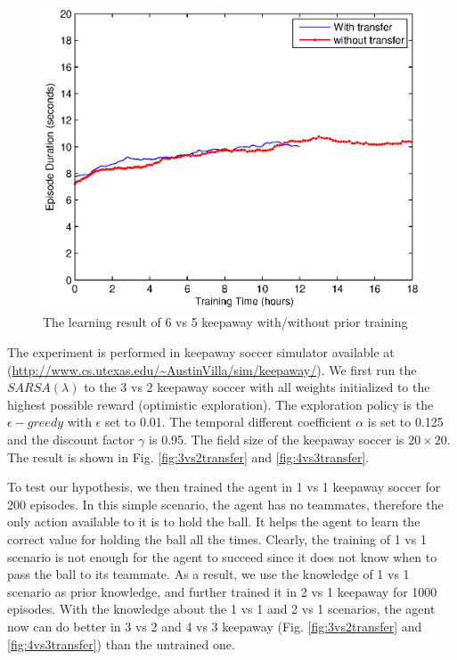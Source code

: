 \begin{figure}[h]
    \centering
    \begin{minipage}[t]{0.6\linewidth}
        \centering
        \includegraphics[width=\textwidth] {./figures/6vs5transfer.eps}
        \caption{The learning result of 6 vs 5 keepaway with/without prior training}
    \label{fig:6vs5transfer}
    \end{minipage}
\end{figure}
The experiment is performed in keepaway soccer simulator available at \\
(\url{http://www.cs.utexas.edu/~AustinVilla/sim/keepaway/}).
We first run the $SARSA(\lambda)$ to the 3 vs 2 keepaway soccer with all weights initialized to the highest possible reward (optimistic exploration). The exploration policy is 
the $\epsilon-greedy$ with $\epsilon$ set to 0.01. The temporal different coefficient $\alpha$ is set to 0.125 and the 
discount factor $\gamma$ is 0.95. The field size of the keepaway soccer is $20 \times 20$. 
The result is shown in Fig. \ref{fig:3vs2transfer} and \ref{fig:4vs3transfer}. 

To test our hypothesis, we then trained the agent in 1 vs 1 keepaway soccer for 200 episodes. 
In this simple scenario, the agent has no teammates, therefore the only action available to it is to hold the ball.
It helps the agent to learn the correct value for holding the ball all the times.
Clearly, the training of 1 vs 1 scenario is not enough for the agent to succeed since it does not know
when to pass the ball to its teammate. As a result, we use the knowledge of 1 vs 1 scenario as prior knowledge, 
and further trained it in 2 vs 1 keepaway for 1000 episodes.
With the knowledge about the 1 vs 1 and 2 vs 1 scenarios, the agent now can do better in 3 vs 2 and 4 vs 3 keepaway (Fig. \ref{fig:3vs2transfer} and \ref{fig:4vs3transfer})
than the untrained one.

